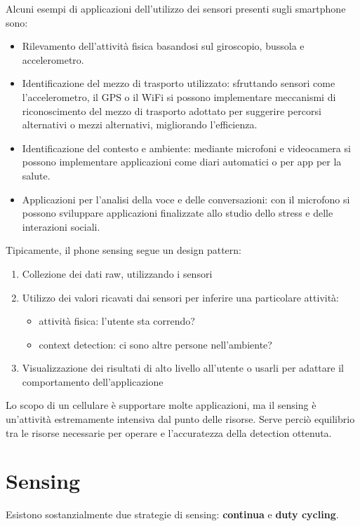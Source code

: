 Alcuni esempi di applicazioni dell'utilizzo dei sensori presenti sugli
smartphone sono:
\begin{itemize}
\item Rilevamento dell'attività fisica basandosi sul giroscopio, bussola e
accelerometro.
\item Identificazione del mezzo di trasporto utilizzato: sfruttando sensori come
l'accelerometro, il GPS o il WiFi si possono implementare meccanismi di
riconoscimento del mezzo di trasporto adottato per suggerire percorsi
alternativi o mezzi alternativi, migliorando l'efficienza.
\item Identificazione del contesto e ambiente: mediante microfoni e videocamera
si possono
implementare applicazioni come diari automatici o per app per la salute.
\item Applicazioni per l'analisi della voce e delle conversazioni: con il
microfono si possono sviluppare applicazioni finalizzate allo studio dello
stress
e delle interazioni sociali.
\end{itemize}

Tipicamente, il phone sensing segue un design pattern:
\begin{enumerate}
        \item Collezione dei dati raw, utilizzando i sensori
        \item Utilizzo dei valori ricavati dai sensori per inferire una
particolare attività:
        \begin{itemize}
                \item attività fisica: l'utente sta correndo?
                \item context detection: ci sono altre persone nell'ambiente?
        \end{itemize}
        \item Visualizzazione dei risultati di alto livello all'utente o usarli
per adattare il
comportamento dell'applicazione
\end{enumerate}

Lo scopo di un cellulare è supportare molte applicazioni, ma il sensing è
un'attività estremamente intensiva dal punto delle risorse. Serve perciò
equilibrio tra le risorse necessarie per operare e l'accuratezza della detection
ottenuta.

\section{Sensing}

Esistono sostanzialmente due strategie di sensing: \textbf{continua} e
\textbf{duty cycling}.

